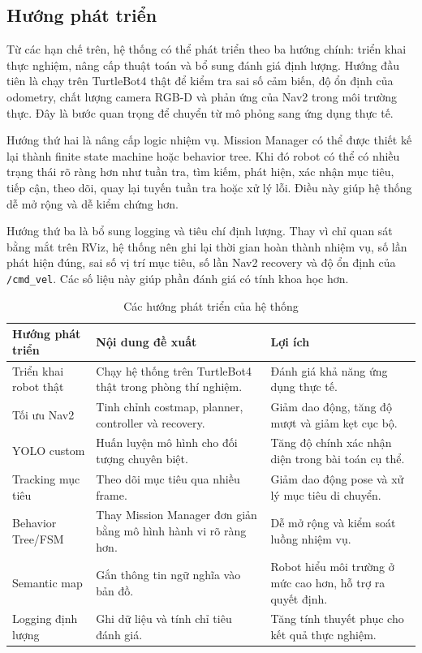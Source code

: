 \subsection{Hướng phát triển}
\label{subsec:future-work}

Từ các hạn chế trên, hệ thống có thể phát triển theo ba hướng chính: triển khai thực nghiệm, nâng cấp thuật toán và bổ sung đánh giá định lượng. Hướng đầu tiên là chạy trên TurtleBot4 thật để kiểm tra sai số cảm biến, độ ổn định của odometry, chất lượng camera RGB-D và phản ứng của Nav2 trong môi trường thực. Đây là bước quan trọng để chuyển từ mô phỏng sang ứng dụng thực tế.

Hướng thứ hai là nâng cấp logic nhiệm vụ. Mission Manager có thể được thiết kế lại thành finite state machine hoặc behavior tree. Khi đó robot có thể có nhiều trạng thái rõ ràng hơn như tuần tra, tìm kiếm, phát hiện, xác nhận mục tiêu, tiếp cận, theo dõi, quay lại tuyến tuần tra hoặc xử lý lỗi. Điều này giúp hệ thống dễ mở rộng và dễ kiểm chứng hơn.

Hướng thứ ba là bổ sung logging và tiêu chí định lượng. Thay vì chỉ quan sát bằng mắt trên RViz, hệ thống nên ghi lại thời gian hoàn thành nhiệm vụ, số lần phát hiện đúng, sai số vị trí mục tiêu, số lần Nav2 recovery và độ ổn định của \texttt{/cmd\_vel}. Các số liệu này giúp phần đánh giá có tính khoa học hơn.

\begin{table}[H]
    \centering
    \caption{Các hướng phát triển của hệ thống}
    \label{tab:future-work}
    \renewcommand{\arraystretch}{1.25}
    \small
    \begin{tabularx}{\textwidth}{|>{\raggedright\arraybackslash}p{}|>{\raggedright\arraybackslash}p{}|>{\raggedright\arraybackslash}X|}
        \hline
        \textbf{Hướng phát triển} & \textbf{Nội dung đề xuất} & \textbf{Lợi ích} \\
        \hline
        Triển khai robot thật & Chạy hệ thống trên TurtleBot4 thật trong phòng thí nghiệm. & Đánh giá khả năng ứng dụng thực tế. \\
        \hline
        Tối ưu Nav2 & Tinh chỉnh costmap, planner, controller và recovery. & Giảm dao động, tăng độ mượt và giảm kẹt cục bộ. \\
        \hline
        YOLO custom & Huấn luyện mô hình cho đối tượng chuyên biệt. & Tăng độ chính xác nhận diện trong bài toán cụ thể. \\
        \hline
        Tracking mục tiêu & Theo dõi mục tiêu qua nhiều frame. & Giảm dao động pose và xử lý mục tiêu di chuyển. \\
        \hline
        Behavior Tree/FSM & Thay Mission Manager đơn giản bằng mô hình hành vi rõ ràng hơn. & Dễ mở rộng và kiểm soát luồng nhiệm vụ. \\
        \hline
        Semantic map & Gắn thông tin ngữ nghĩa vào bản đồ. & Robot hiểu môi trường ở mức cao hơn, hỗ trợ ra quyết định. \\
        \hline
        Logging định lượng & Ghi dữ liệu và tính chỉ tiêu đánh giá. & Tăng tính thuyết phục cho kết quả thực nghiệm. \\
        \hline
    \end{tabularx}
\end{table}

